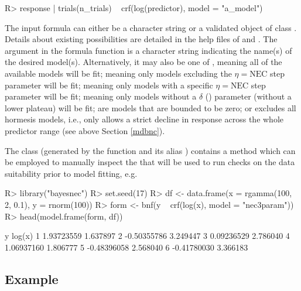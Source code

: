 \documentclass[
  shortnames]{jss}
\begin{document}
\begin{CodeChunk}
\begin{CodeInput}
R> response | trials(n_trials) ~ crf(log(predictor), model = "a_model")
\end{CodeInput}
\end{CodeChunk}

The input formula can either be a character string or a validated object of class . Details about existing possibilities are detailed in the help files of  and . The argument  in the formula function  is a character string indicating the name(s) of the desired model(s). Alternatively, it may also be one of , meaning all of the available models will be fit;  meaning only models excluding the \(\eta = \text{NEC}\) step parameter will be fit;  meaning only models with a specific \(\eta = \text{NEC}\) step parameter will be fit;  meaning only models without a \(\delta\) () parameter (without a lower plateau) will be fit;  are models that are bounded to be zero; or  excludes all hormesis models, i.e., only allows a strict decline in response across the whole predictor range (see above Section \ref{mdbnc}).

The class  (generated by the function  and its alias ) contains a  method which can be employed to manually inspect the  that will be used to run checks on the data suitability prior to model fitting, e.g.

\begin{CodeChunk}
\begin{CodeInput}
R> library("bayesnec")
R> set.seed(17)
R> df <- data.frame(x = rgamma(100, 2, 0.1), y = rnorm(100))
R> form <- bnf(y ~ crf(log(x), model = "nec3param"))
R> head(model.frame(form, df))
\end{CodeInput}
\begin{CodeOutput}
            y   log(x)
1  1.93723559 1.637897
2 -0.50355786 3.249447
3  0.09236529 2.786040
4  1.06937160 1.806777
5 -0.48396058 2.568040
6 -0.41780030 3.366183
\end{CodeOutput}
\end{CodeChunk}

\subsection[Example]{Example}\label{example}
\end{document}
